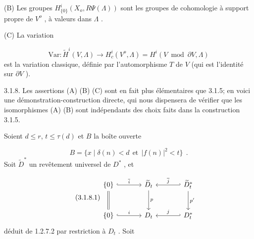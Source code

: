 (B) Les groupes $H^i_{\{0\}}(X_o, R\Psi(\Lambda))$ sont les groupes de cohomologie à support propre de $V^o$ , à valeurs dans $\Lambda$ .

(C) La variation 



\begin{equation*}
 \mathrm{Var} : \widetilde{H}^i(V, \Lambda) \longrightarrow H^i_c(V^o, \Lambda) = H^i(V \bmod \partial V, \Lambda)
\end{equation*}
est la variation classique, définie par l'automorphisme $T$ de $V$ (qui est l'identité sur $\partial V$ ).

3.1.8. Les assertions (A) (B) (C) sont en fait plus élémentaires que 3.1.5; en voici une démonstration-construction directe, qui nous dispensera de vérifier que les isomorphismes (A) (B) sont indépendants des choix faits dans la construction 3.1.5.

Soient $d \leq r$, $t \leq \tau(d)$ et $B$ la boîte ouverte

\begin{equation*}
B = \{x \mid \delta(n) < d \ \ \text{et} \ \ |f(n)|^2 < t\} \ \ .
\end{equation*}
Soit $\widetilde{D}^*$ un revêtement universel de $D^*$ , et

\begin{equation}\tag{3.1.8.1}
\begin{tikzcd}[column sep=large, row sep=large]
\{0\} \arrow[r, hook, "\overline{i}"] \arrow[d, equal] & \widetilde{D}_t \arrow[d, "p"] & \widetilde{D}^*_t \arrow[l, hook', "\overline{j}"'] \arrow[d, "p'"] \\
\{0\} \arrow[r, hook, "i"] & D_t & D^*_t \arrow[l, hook', "j"']
\end{tikzcd}
\end{equation}
déduit de 1.2.7.2 par restriction à $D_t$ . Soit


